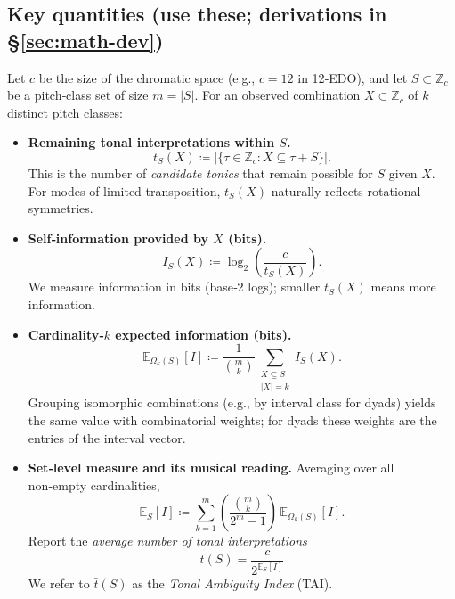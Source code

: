 \documentclass[10pt,twocolumn]{article}
\numberwithin{equation}{section} %
\begin{document}
    \subsection*{Key quantities (use these; derivations in \S\ref{sec:math-dev})}
    Let $c$ be the size of the chromatic space (e.g., $c=12$ in 12‑EDO), and let $S\subset\mathbb{Z}_c$ be a pitch‑class set of size $m=|S|$. For an observed combination $X\subset\mathbb{Z}_c$ of $k$ distinct pitch classes:
    \begin{itemize}
        \item \textbf{Remaining tonal interpretations within $S$.}
        \[
            t_S(X) \coloneqq \bigl|\{\tau\in \mathbb{Z}_c : X \subseteq \tau{+}S\}\bigr|.
        \]
        This is the number of \emph{candidate tonics} that remain possible for $S$ given $X$. For modes of limited transposition, $t_S(X)$ naturally reflects rotational symmetries.

        \item \textbf{Self‑information provided by $X$ (bits).}
        \[
            I_S(X) \coloneqq \log_2\!\left(\frac{c}{t_S(X)}\right).
        \]
        We measure information in bits (base‑2 logs); smaller $t_S(X)$ means more information.

        \item \textbf{Cardinality‑$k$ expected information (bits).}
        \[
            \mathbb{E}_{\Omega_k(S)}[I]
            \coloneqq \frac{1}{\binom{m}{k}} \sum_{\substack{X\subseteq S\\ |X|=k}} I_S(X).
        \]
        Grouping isomorphic combinations (e.g., by interval class for dyads) yields the same value with combinatorial weights; for dyads these weights are the entries of the interval vector.

        \item \textbf{Set‑level measure and its musical reading.}
        Averaging over all non‑empty cardinalities,
        \[
            \mathbb{E}_S[I]
            \coloneqq \sum_{k=1}^{m}\!\left(\frac{\binom{m}{k}}{2^m-1}\right)\,\mathbb{E}_{\Omega_k(S)}[I].
        \]
        Report the \emph{average number of tonal interpretations}
        \[
            \boxed{\;\bar{t}(S)=\dfrac{c}{2^{\mathbb{E}_S[I]}}\;}
        \]
        We refer to $\bar{t}(S)$ as the \emph{Tonal Ambiguity Index} (TAI).
    \end{itemize}
\end{document}
